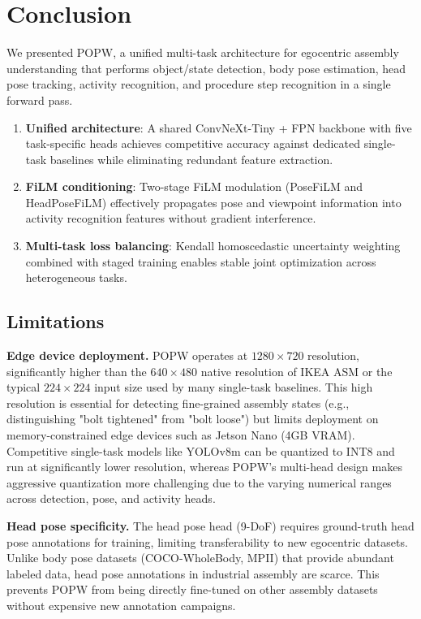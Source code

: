 \documentclass[11pt,a4paper]{article}
\newcommand{\popw}{POPW}
\begin{document}
\FloatBarrier

\section{Conclusion}
\label{sec:conclusion}

We presented \popw{}, a unified multi-task architecture for egocentric assembly understanding that performs object/state detection, body pose estimation, head pose tracking, activity recognition, and procedure step recognition in a single forward pass.

\begin{enumerate}
\item \textbf{Unified architecture}: A shared ConvNeXt-Tiny + FPN backbone with five task-specific heads achieves competitive accuracy against dedicated single-task baselines while eliminating redundant feature extraction.
\item \textbf{FiLM conditioning}: Two-stage FiLM modulation (PoseFiLM and HeadPoseFiLM) effectively propagates pose and viewpoint information into activity recognition features without gradient interference.
\item \textbf{Multi-task loss balancing}: Kendall homoscedastic uncertainty weighting combined with staged training enables stable joint optimization across heterogeneous tasks.
\end{enumerate}

\subsection{Limitations}
\label{sec:limitations}

\textbf{Edge device deployment.} POPW operates at $1280\times720$ resolution, significantly higher than the $640\times480$ native resolution of IKEA ASM or the typical $224\times224$ input size used by many single-task baselines. This high resolution is essential for detecting fine-grained assembly states (e.g., distinguishing "bolt tightened" from "bolt loose") but limits deployment on memory-constrained edge devices such as Jetson Nano (4GB VRAM). Competitive single-task models like YOLOv8m can be quantized to INT8 and run at significantly lower resolution, whereas POPW's multi-head design makes aggressive quantization more challenging due to the varying numerical ranges across detection, pose, and activity heads.

\textbf{Head pose specificity.} The head pose head (9-DoF) requires ground-truth head pose annotations for training, limiting transferability to new egocentric datasets. Unlike body pose datasets (COCO-WholeBody, MPII) that provide abundant labeled data, head pose annotations in industrial assembly are scarce. This prevents POPW from being directly fine-tuned on other assembly datasets without expensive new annotation campaigns.
\end{document}
